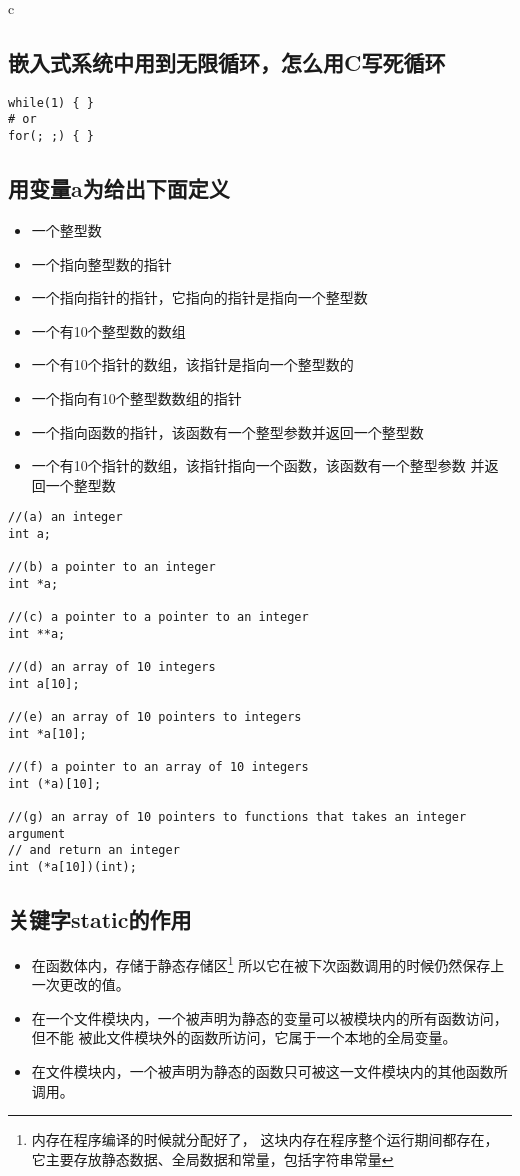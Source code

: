\documentclass{article}
\begin{document}
\begin{mitned}{c}
\subsection{嵌入式系统中用到无限循环，怎么用C写死循环}
\begin{verbatim}
while(1) { }
# or
for(; ;) { }
\end{verbatim}


\subsection{用变量a为给出下面定义}
\begin{itemize}
\item[(a)] 一个整型数
\item[(b)] 一个指向整型数的指针
\item[(c)] 一个指向指针的指针，它指向的指针是指向一个整型数
\item[(d)] 一个有10个整型数的数组
\item[(e)] 一个有10个指针的数组，该指针是指向一个整型数的
\item[(f)] 一个指向有10个整型数数组的指针
\item[(g)] 一个指向函数的指针，该函数有一个整型参数并返回一个整型数
\item[(h)] 一个有10个指针的数组，该指针指向一个函数，该函数有一个整型参数
并返回一个整型数

\end{itemize}

\begin{verbatim}
//(a) an integer
int a;

//(b) a pointer to an integer
int *a;

//(c) a pointer to a pointer to an integer
int **a;

//(d) an array of 10 integers
int a[10];

//(e) an array of 10 pointers to integers
int *a[10];

//(f) a pointer to an array of 10 integers
int (*a)[10];

//(g) an array of 10 pointers to functions that takes an integer argument
// and return an integer
int (*a[10])(int);

\end{verbatim}

\subsection{关键字static的作用}
\begin{itemize}
\item[(1)] 在函数体内，存储于静态存储区\footnote{内存在程序编译的时候就分配好了， 
这块内存在程序整个运行期间都存在，它主要存放静态数据、全局数据和常量，包括字符串常量}
所以它在被下次函数调用的时候仍然保存上一次更改的值。
\item[(2)] 在一个文件模块内，一个被声明为静态的变量可以被模块内的所有函数访问，但不能
被此文件模块外的函数所访问，它属于一个本地的全局变量。
\item[(3)] 在文件模块内，一个被声明为静态的函数只可被这一文件模块内的其他函数所调用。
\end{itemize}


\end{mitned}
\end{document}
